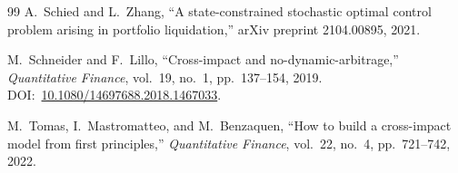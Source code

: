 \documentclass[12pt]{article}
\theoremstyle{definition}
\theoremstyle{remark}
\begin{document}
\begin{thebibliography}{99}
A.~Schied and L.~Zhang,
``A state-constrained stochastic optimal control problem arising in
  portfolio liquidation,''
arXiv preprint 2104.00895, 2021.

M.~Schneider and F.~Lillo,
``Cross-impact and no-dynamic-arbitrage,''
\emph{Quantitative Finance}, vol.~19, no.~1, pp.~137--154, 2019.
DOI:~\href{https://doi.org/10.1080/14697688.2018.1467033}{10.1080/14697688.2018.1467033}.

M.~Tomas, I.~Mastromatteo, and M.~Benzaquen,
``How to build a cross-impact model from first principles,''
\emph{Quantitative Finance}, vol.~22, no.~4, pp.~721--742, 2022.

\end{thebibliography}
\end{document}
